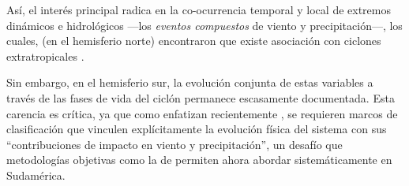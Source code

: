 Así, el interés principal radica en la co-ocurrencia temporal y local de extremos dinámicos e hidrológicos —los \textit{eventos compuestos} de viento y precipitación—, los cuales, \citet{chen2025characteristics} (en el hemisferio norte) encontraron que existe asociación con ciclones extratropicales .

Sin embargo, en el hemisferio sur, la evolución conjunta de estas variables a través de las fases de vida del ciclón permanece escasamente documentada. Esta carencia es crítica, ya que como enfatizan recientemente \citet{han2025system}, se requieren marcos de clasificación que vinculen explícitamente la evolución física del sistema con sus ``contribuciones de impacto en viento y precipitación'', un desafío que metodologías objetivas como la de \citet{coutodesouza2024new} permiten ahora abordar sistemáticamente en Sudamérica.


